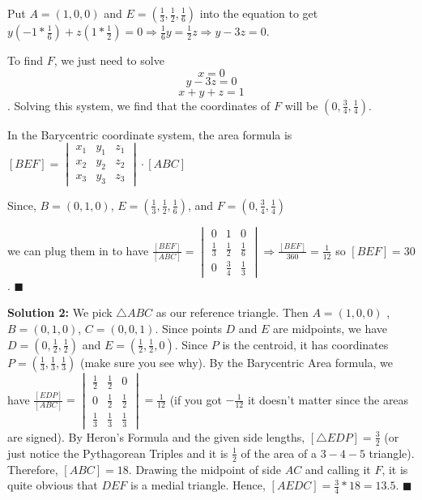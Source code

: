 \documentclass{article}
\begin{document}
Put $A=(1,0,0)$ and $E=(\frac 13,\frac 12,\frac 16)$ into the equation to get $y(-1*\frac 16)+z(1*\frac 12)=0 \Rightarrow \frac 16y=\frac 12z\Rightarrow y-3z=0$. 

To find $F$, we just need to solve $$x=0$$ $$y-3z=0$$ $$x+y+z=1$$. Solving this system, we find that the coordinates of $F$ will be $\left(0, \frac{3}{4}, \frac{1}{4} \right)$.

In the Barycentric coordinate system, the area formula is $[BEF]=\begin{vmatrix}
x_{1} &y_{1}  &z_{1} \\ 
x_{2} &y_{2}  &z_{2} \\ 
 x_{3}& y_{3} & z_{3}
\end{vmatrix}\cdot [ABC]$

Since, $B=(0,1,0)$, $E=(\frac 13,\frac 12,\frac 16)$, and $F=\left(0, \frac{3}{4}, \frac{1}{4} \right)$

we can plug them in to have $\frac{[BEF]}{[ABC]}=\begin{vmatrix}
0&1 &0 \\ 
\frac{1}{3} &\frac{1}{2} &\frac{1}{6} \\ 
0&\frac{3}{4}&  \frac{1}{3} 
\end{vmatrix}\Rightarrow \frac{[BEF]}{360}=\frac{1}{12}$ so $[BEF]=30$. $\blacksquare$
\vspace{.2in}


\textbf{Solution 2:}
We pick $\bigtriangleup ABC$ as our reference triangle. Then $A=(1,0,0)$ , $B=(0,1,0)$, $C=(0,0,1)$. Since points $D$ and $E$ are midpoints, we have $D=(0,\frac 12,\frac 12)$ and $E=(\frac 12,\frac 12,0)$. Since $P$ is the centroid, it has coordinates $P=(\frac13,\frac13,\frac13)$ (make sure you see why). By the Barycentric Area formula, we have $\frac{[EDP]}{[ABC]}=\begin{vmatrix}
\frac 12 &\frac 12 &0 \\
0 &\frac 12 &\frac 12 \\
\frac 13& \frac 13&\frac 13
\end{vmatrix} = \frac {1}{12}$ (if you got $-\frac {1}{12}$ it doesn't matter since the areas are signed). By Heron's Formula and the given side lengths, $[\triangle EDP]=\frac 32$ (or just notice the Pythagorean Triples and it is $\frac 12$ of the area of a $3-4-5$ triangle). Therefore, $[ABC]=18$. Drawing the midpoint of side $AC$ and calling it $F$, it is quite obvious that $DEF$ is a medial triangle. Hence, $[AEDC]=\frac 34 * 18 = 13.5$. $\blacksquare$
\vspace{.2in}
\end{document}
